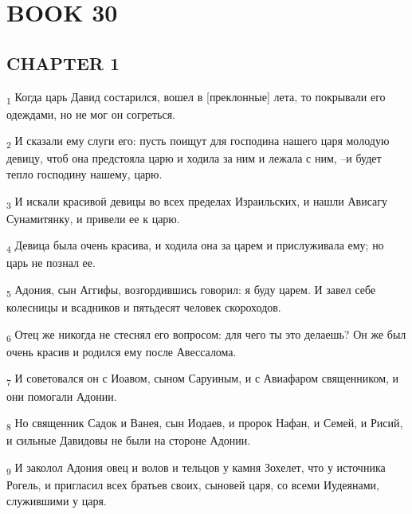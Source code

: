 \section{BOOK 30}
\subsection{CHAPTER 1}
\begin{tcolorbox}
\textsubscript{1} Когда царь Давид состарился, вошел в [преклонные] лета, то покрывали его одеждами, но не мог он согреться.
\end{tcolorbox}
\begin{tcolorbox}
\textsubscript{2} И сказали ему слуги его: пусть поищут для господина нашего царя молодую девицу, чтоб она предстояла царю и ходила за ним и лежала с ним, --и будет тепло господину нашему, царю.
\end{tcolorbox}
\begin{tcolorbox}
\textsubscript{3} И искали красивой девицы во всех пределах Израильских, и нашли Ависагу Сунамитянку, и привели ее к царю.
\end{tcolorbox}
\begin{tcolorbox}
\textsubscript{4} Девица была очень красива, и ходила она за царем и прислуживала ему; но царь не познал ее.
\end{tcolorbox}
\begin{tcolorbox}
\textsubscript{5} Адония, сын Аггифы, возгордившись говорил: я буду царем. И завел себе колесницы и всадников и пятьдесят человек скороходов.
\end{tcolorbox}
\begin{tcolorbox}
\textsubscript{6} Отец же никогда не стеснял его вопросом: для чего ты это делаешь? Он же был очень красив и родился ему после Авессалома.
\end{tcolorbox}
\begin{tcolorbox}
\textsubscript{7} И советовался он с Иоавом, сыном Саруиным, и с Авиафаром священником, и они помогали Адонии.
\end{tcolorbox}
\begin{tcolorbox}
\textsubscript{8} Но священник Садок и Ванея, сын Иодаев, и пророк Нафан, и Семей, и Рисий, и сильные Давидовы не были на стороне Адонии.
\end{tcolorbox}
\begin{tcolorbox}
\textsubscript{9} И заколол Адония овец и волов и тельцов у камня Зохелет, что у источника Рогель, и пригласил всех братьев своих, сыновей царя, со всеми Иудеянами, служившими у царя.
\end{tcolorbox}
